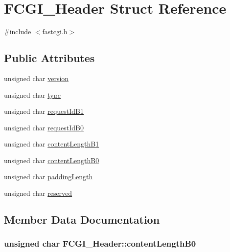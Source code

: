\hypertarget{structFCGI__Header}{\section{F\-C\-G\-I\-\_\-\-Header Struct Reference}
\label{structFCGI__Header}
}


{\ttfamily \#include $<$fastcgi.\-h$>$}

\subsection*{Public Attributes}
\begin{DoxyCompactItemize}
\item 
unsigned char \hyperlink{structFCGI__Header_ad1bf48caf468a7251b419453502a4f52}{version}
\item 
unsigned char \hyperlink{structFCGI__Header_a19d813d810077c13638890f0ea0710f8}{type}
\item 
unsigned char \hyperlink{structFCGI__Header_aaaffa134f46b2fef7b3869811cbce96d}{request\-Id\-B1}
\item 
unsigned char \hyperlink{structFCGI__Header_adc8534fcead13ed5b30d73463ae72cef}{request\-Id\-B0}
\item 
unsigned char \hyperlink{structFCGI__Header_a4062d9e45a31f00b0c4a723b105eeac2}{content\-Length\-B1}
\item 
unsigned char \hyperlink{structFCGI__Header_a8607341c4c387283b21d0b79d13763a2}{content\-Length\-B0}
\item 
unsigned char \hyperlink{structFCGI__Header_a00c2e5dc1e01e49266d5d8229da6217e}{padding\-Length}
\item 
unsigned char \hyperlink{structFCGI__Header_ac8196d4f373fb5ec71636ce2e4cc859b}{reserved}
\end{DoxyCompactItemize}


\subsection{Member Data Documentation}
\hypertarget{structFCGI__Header_a8607341c4c387283b21d0b79d13763a2}{
\subsubsection[{content\-Length\-B0}]{\setlength{\rightskip}{0pt plus 5cm}unsigned char F\-C\-G\-I\-\_\-\-Header\-::content\-Length\-B0}}\label{structFCGI__Header_a8607341c4c387283b21d0b79d13763a2}


